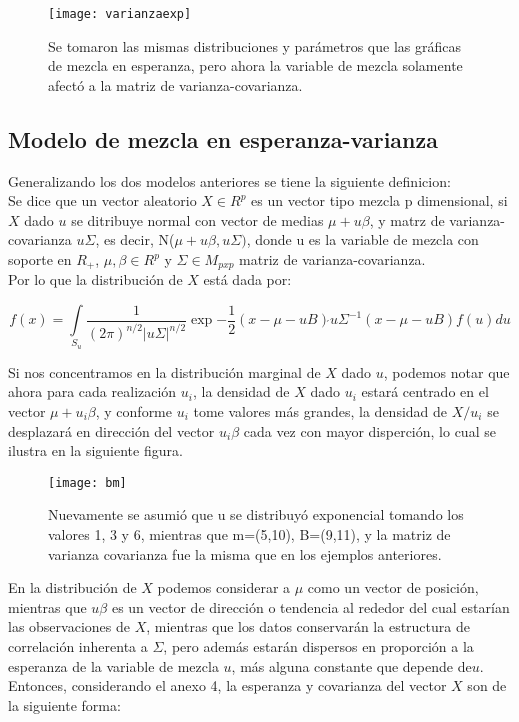 \documentclass[11pt]{book}
\begin{document}
\begin{figure}
\centering
\texttt{[image: varianzaexp]}
\caption{Se tomaron las mismas distribuciones y parámetros que las gráficas de mezcla en esperanza, pero ahora la variable de mezcla solamente afectó a la matriz de varianza-covarianza.}
\end{figure}


\pagebreak
\subsection*{Modelo de mezcla en esperanza-varianza}

Generalizando los dos modelos anteriores se tiene la siguiente definicion:\\

Se dice que un vector aleatorio $X\in R^{p}$ es un vector tipo mezcla p dimensional, si $X$ dado $u$ se ditribuye normal con vector de medias $\mu +u\beta$, y matrz de varianza-covarianza $u\Sigma$, es decir, N($\mu + u\beta, u\Sigma)$, donde u es la variable de mezcla con soporte en $R_{+}$, $\mu, \beta \in R^{p}$ y $\Sigma\in M_{pxp}$ matriz de varianza-covarianza.\\


Por lo que la distribución de $X$ está dada por:

\begin{equation*}
f(x)=\underset{S_{u}}{\int}\dfrac{1}{(2\pi)^{n/2}|u\Sigma|^{n/2}}\exp{-\dfrac{1}{2}(x-\mu-uB)\acute{}u\Sigma^{-1}(x-\mu-uB)}f(u)du 
\end{equation*}

Si nos concentramos en la distribución marginal de $X$ dado $u$, podemos notar que ahora para cada realización  $u_{i}$, la densidad de $X$ dado $u_{i}$ estará centrado en el vector $\mu + u_{i}\beta$, y conforme $u_{i}$ tome valores más grandes, la densidad de $X/u_{i}$ se desplazará en dirección del vector $u_{i}\beta$ cada vez con mayor disperción, lo cual se ilustra en la siguiente figura.\\

\begin{figure}
\centering
\texttt{[image: bm]}
\caption{Nuevamente se asumió que u se distribuyó exponencial tomando los valores 1, 3 y 6, mientras que m=(5,10), B=(9,11), y la matriz de varianza covarianza fue la misma que en los ejemplos anteriores.}
\end{figure}



En la distribución de $X$ podemos considerar a $\mu$ como un vector de posición, mientras que $u\beta$ es un vector de dirección o tendencia al rededor del cual estarían las observaciones de $X$, mientras que los datos conservarán la estructura de correlación inherenta a $\Sigma$, pero además estarán dispersos en proporción a la esperanza de la variable de mezcla $u$, más alguna constante que depende de$u$. Entonces, considerando el anexo 4,  la esperanza y covarianza del vector $X$ son de la siguiente forma:
\end{document}
